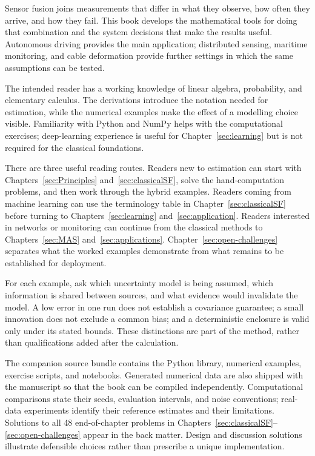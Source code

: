 \preface
Sensor fusion joins measurements that differ in what they observe, how often they arrive, and how they fail. This book develops the mathematical tools for doing that combination and the system decisions that make the results useful. Autonomous driving provides the main application; distributed sensing, maritime monitoring, and cable deformation provide further settings in which the same assumptions can be tested.

The intended reader has a working knowledge of linear algebra, probability, and elementary calculus. The derivations introduce the notation needed for estimation, while the numerical examples make the effect of a modelling choice visible. Familiarity with Python and NumPy helps with the computational exercises; deep-learning experience is useful for Chapter~\ref{sec:learning} but is not required for the classical foundations.

There are three useful reading routes. Readers new to estimation can start with Chapters~\ref{sec:Principles} and~\ref{sec:classicalSF}, solve the hand-computation problems, and then work through the hybrid examples. Readers coming from machine learning can use the terminology table in Chapter~\ref{sec:classicalSF} before turning to Chapters~\ref{sec:learning} and~\ref{sec:application}. Readers interested in networks or monitoring can continue from the classical methods to Chapters~\ref{sec:MAS} and~\ref{sec:applications}. Chapter~\ref{sec:open-challenges} separates what the worked examples demonstrate from what remains to be established for deployment.

For each example, ask which uncertainty model is being assumed, which information is shared between sources, and what evidence would invalidate the model. A low error in one run does not establish a covariance guarantee; a small innovation does not exclude a common bias; and a deterministic enclosure is valid only under its stated bounds. These distinctions are part of the method, rather than qualifications added after the calculation.

The companion source bundle contains the Python library, numerical examples, exercise scripts, and notebooks. Generated numerical data are also shipped with the manuscript so that the book can be compiled independently. Computational comparisons state their seeds, evaluation intervals, and noise conventions; real-data experiments identify their reference estimates and their limitations. Solutions to all 48 end-of-chapter problems in Chapters~\ref{sec:classicalSF}--\ref{sec:open-challenges} appear in the back matter. Design and discussion solutions illustrate defensible choices rather than prescribe a unique implementation.
